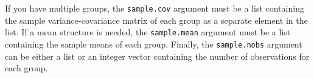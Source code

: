 If you have multiple groups, the \texttt{sample.cov} argument must be a
list containing the sample variance-covariance matrix of each group as a
separate element in the list. If a mean structure is needed, the
\texttt{sample.mean} argument must be a list containing the sample means
of each group. Finally, the \texttt{sample.nobs} argument can be either
a list or an integer vector containing the number of observations for
each group.
